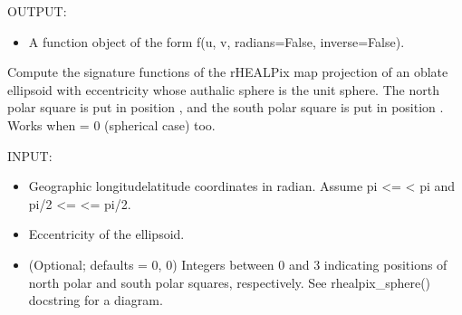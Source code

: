 \documentclass[a4paper,12ptopenany,oneside,english]{sphinxmanual}
\begin{document}
\begin{fulllineitems}
\sphinxAtStartPar
OUTPUT:
\begin{itemize}
\item {} 
\sphinxAtStartPar
A function object of the form f(u, v, radians=False, inverse=False).

\end{itemize}

\end{fulllineitems}


\begin{fulllineitems}
\label{\detokenize{pj_rhealpix:rhealpixdggs.pj_rhealpix.rhealpix_ellipsoid}}
\pysigstartsignatures
{}
\pysigstopsignatures
\sphinxAtStartPar
Compute the signature functions of the rHEALPix map
projection of an oblate ellipsoid with eccentricity  whose
authalic sphere is the unit sphere.
The north polar square is put in position ,
and the south polar square is put in position .
Works when  = 0 (spherical case) too.

\sphinxAtStartPar
INPUT:
\begin{itemize}
\item {} 
\sphinxAtStartPar
{} \sphinxhyphen{} Geographic longitude\sphinxhyphen{}latitude coordinates in radian.
Assume \sphinxhyphen{}pi \textless{}=  \textless{} pi and \sphinxhyphen{}pi/2 \textless{}=  \textless{}= pi/2.

\item {} 
\sphinxAtStartPar
{} \sphinxhyphen{} Eccentricity of the ellipsoid.

\item {} 
\sphinxAtStartPar
{} \sphinxhyphen{} (Optional; defaults = 0, 0) Integers
between 0 and 3 indicating positions of north polar and
south polar squares, respectively.
See rhealpix\_sphere() docstring for a diagram.


\end{itemize}
\end{fulllineitems}
\end{document}
